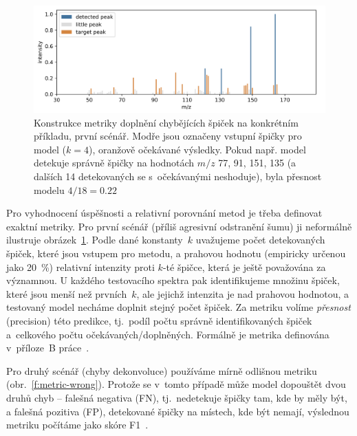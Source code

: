 \documentclass[a4paper,11pt]{article}
\begin{document}
\begin{figure}
\begin{center}
\includegraphics[width=.8\hsize]{metric-missing}
\end{center}
\caption{Konstrukce metriky doplnění chybějících špiček na konkrétním příkladu, první scénář.
Modře jsou označeny vstupní špičky pro model ($k=4$), oranžově očekávané výsledky.
Pokud např. model detekuje správně špičky na hodnotách $m/z$ 77, 91, 151, 135 (a dalších 14 detekovaných se
s~očekávanými neshoduje), byla přesnost modelu $4/18 = 0.22$
}
\label{f:metric-missing}
\end{figure}

Pro vyhodnocení úspěšnosti a relativní porovnání metod je třeba definovat exaktní metriky.
Pro první scénář (příliš agresivní odstranění šumu) ji 
neformálně ilustruje obrázek~\ref{f:metric-missing}.
Podle dané konstanty~$k$ uvažujeme počet detekovaných špiček, které jsou vstupem pro metodu,
a prahovou hodnotu (empiricky určenou jako 20~\%) relativní intenzity proti $k$-té špičce,
která je ještě považována za významnou. 
U každého testovacího spektra pak identifikujeme množinu špiček, které jsou menší než prvních~$k$,
ale jejichž intenzita je nad prahovou hodnotou, a testovaný model necháme doplnit stejný počet špiček.
Za metriku volíme \emph{přesnost} (precision) této predikce, tj.\ podíl počtu správně identifikovaných špiček
a~celkového počtu očekávaných/doplněných.
Formálně je metrika definována v~příloze~B práce~\cite{stary}. 

Pro druhý scénář (chyby dekonvoluce) používáme mírně odlišnou metriku (obr.~\ref{f:metric-wrong}).
Protože se v~tomto případě může model dopouštět dvou druhů chyb -- falešná negativa (FN), tj.\ nedetekuje špičky tam,
kde by měly být, a falešná pozitiva (FP), detekované špičky na místech, kde být nemají,
výslednou metriku počítáme jako skóre F1~\cite{f1}.
\end{document}

